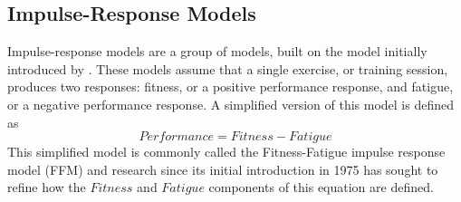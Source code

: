 \subsection{Impulse-Response Models} 
Impulse-response models are a group of models, built on the model initially introduced by \textcite{Bannister1976}. These models assume that a single exercise, or training session, produces two responses: fitness, or a positive performance response, and fatigue, or a negative performance response. A simplified version of this model is defined as 
\begin{equation}\label{eq:ffm}
  Performance = Fitness - Fatigue
\end{equation}
This simplified model is commonly called the Fitness-Fatigue impulse response model (FFM) and research since its initial introduction in 1975 has sought to refine how the $Fitness$ and $Fatigue$ components of this equation are defined.

